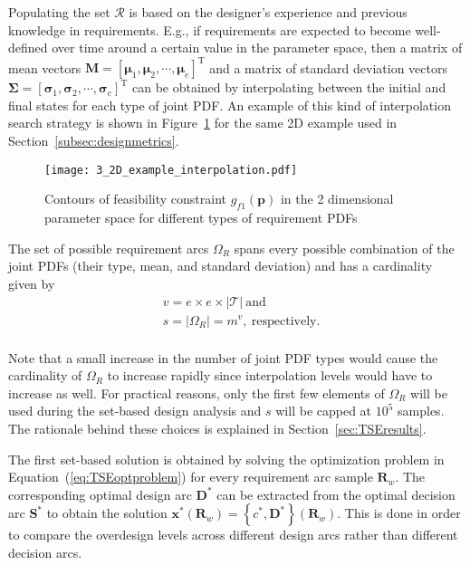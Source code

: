 Populating the set $\mathcal{R}$ is based on the designer's experience and previous knowledge in requirements. E.g., if requirements are expected to become well-defined over time around a certain value in the parameter space, then a matrix of mean vectors $\mathbf{M} = \left[\boldsymbol{\mu}_1,\boldsymbol{\mu}_2,\cdots,\boldsymbol{\mu}_e\right]^{\textrm{T}}$ and a matrix of standard deviation vectors $\boldsymbol{\Sigma} = \left[\boldsymbol{\sigma}_1,\boldsymbol{\sigma}_2,\cdots,\boldsymbol{\sigma}_e\right]^{\textrm{T}}$ can be obtained by interpolating between the initial and final states for each type of joint \ac{PDF}. An example of this kind of interpolation search strategy is shown in Figure~\ref{fig:2Dexampleinterp} for the same 2D example used in Section~\ref{subsec:designmetrics}.

\begin{figure}[h!]
	\centering
	\texttt{[image: 3\_2D\_example\_interpolation.pdf]}
	\caption{{\color{red} Contours of feasibility constraint $g_{f1}(\mathbf{p})$ in the 2 dimensional parameter space for different types of requirement \acp{PDF}}}
	\label{fig:2Dexampleinterp}
\end{figure}

The set of possible requirement arcs $\Omega_R$ spans every possible combination of the joint \acp{PDF} (their type, mean, and standard deviation) and has a cardinality given by
%
\begin{equation*}
	\begin{aligned}
		& v = e \times e \times |\mathcal{T}|~\mathrm{and}\\
		& s = |\Omega_R| = m^{v},~\mathrm{respectively}.\\
	\end{aligned}
\end{equation*}

Note that a small increase in the number of joint \ac{PDF} types would cause the cardinality of $\Omega_R$ to increase rapidly since interpolation levels would have to increase as well. For practical reasons, only the first few elements of $\Omega_R$ will be used during the set-based design analysis and $s$ will be capped at $10^5$ samples. The rationale behind these choices is explained in Section~\ref{sec:TSEresults}.

The first set-based solution is obtained by solving the optimization problem in Equation~(\ref{eq:TSEoptproblem}) for every requirement arc sample $\mathbf{R}_w$. The corresponding optimal design arc $\mathbf{D}^*$ can be extracted from the optimal decision arc $\mathbf{S}^*$ to obtain the solution $\mathbf{x}^*(\mathbf{R}_w) = \left\{c^*,\mathbf{D}^*\right\}(\mathbf{R}_w)$. This is done in order to compare the overdesign levels across different design arcs rather than different decision arcs.

